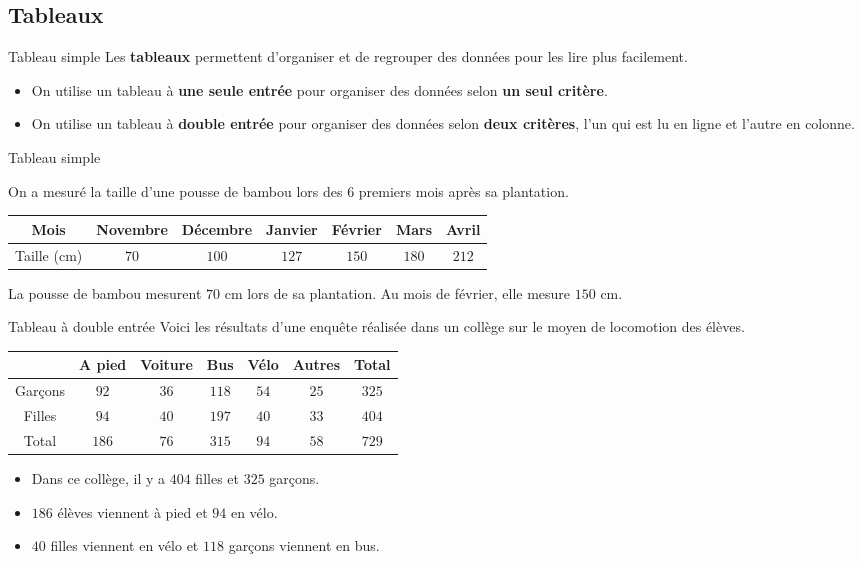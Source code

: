 \begin{pageCours} 

\section{Tableaux}

\begin{DefT}{Tableau simple}
Les \textbf{tableaux} permettent d'organiser et de regrouper des données pour les lire plus facilement.
\begin{itemize}
\item On utilise un tableau à \textbf{une seule entrée} pour organiser des données selon \textbf{un seul critère}.
\item On utilise un tableau à \textbf{double entrée} pour organiser des données selon \textbf{deux critères}, l'un qui est lu en ligne et l'autre en colonne.
\end{itemize}
\end{DefT}


\begin{Ex}{Tableau simple}

On a mesuré la taille d'une pousse de bambou lors des 6 premiers mois après sa plantation.
 \begin{center}
 \begin{tabular}{|c|c|c|c|c|c|c|} 
  \hline
  Mois & Novembre & Décembre & Janvier  & Février & Mars & Avril \\
  \hline
  Taille (cm) & $70$ & $100$ & $127$ & $150$ & $180$ & $212$  \\
  \hline
 \end{tabular}
 \end{center}

La pousse de bambou mesurent $70$ cm lors de sa plantation. Au mois de février, elle mesure $150$ cm.
\end{Ex}


\begin{Ex}{Tableau à double entrée}
Voici les résultats d'une enquête réalisée dans un collège sur le moyen de locomotion des élèves.
 \begin{center}
 \begin{tabular}{|c|c|c|c|c|c|c|}
  & A pied & Voiture & Bus &  Vélo & Autres & Total \\  \hline
  Garçons & $92$ & $36$ & $118$ & $54$ & $25$ & $325$  \\\hline
  Filles &  $94$ & $40$ & $197$ & $40$ & $33$ & $404$ \\\hline
  Total & $186$ & $76$ & $315$& $94$ & $58$ & $729$ \\
 \end{tabular}
 \end{center}
 \begin{itemize}
 \item Dans ce collège, il y a $404$ filles et $325$ garçons.
 \item $186$ élèves viennent à pied et $94$ en vélo.
 \item $40$ filles viennent en vélo et $118$ garçons viennent en bus.
\end{itemize}
\end{Ex}


\end{pageCours}
